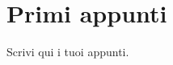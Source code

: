 \documentclass[a4paper,11pt]{article}
\begin{document}
\section{Primi appunti}
Scrivi qui i tuoi appunti.
\end{document}
